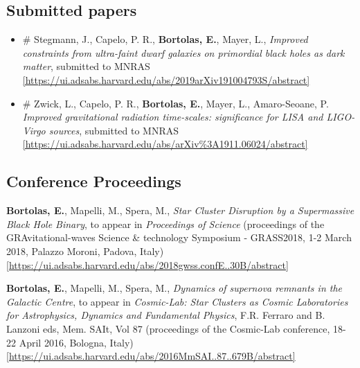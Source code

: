 \documentclass[11pt,a4paper]{article}
\begin{document}
\subsection*{ Submitted papers }

\begin{itemize}
\setlength\itemsep{-1pt}
\item  \# Stegmann, J., Capelo, P. R.,  {\bf Bortolas, E.}, Mayer, L., { \it Improved constraints from ultra-faint dwarf galaxies on primordial black holes as dark matter}, submitted to MNRAS \\ \href{https://ui.adsabs.harvard.edu/abs/2019arXiv191004793S/abstract}{\scriptsize [https://ui.adsabs.harvard.edu/abs/2019arXiv191004793S/abstract]}

\item  \# Zwick, L., Capelo, P. R., \textbf{Bortolas, E.}, Mayer, L., Amaro-Seoane, P. { \it Improved gravitational radiation time-scales: significance for LISA and LIGO-Virgo sources}, submitted to MNRAS \\ \href{https://ui.adsabs.harvard.edu/abs/arXiv\%3A1911.06024/abstract}{\scriptsize [https://ui.adsabs.harvard.edu/abs/arXiv\%3A1911.06024/abstract]}
\end{itemize}


\subsection*{Conference Proceedings }



\begin{etaremune}

\item {\bf Bortolas, E.}, Mapelli, M., Spera, M., {\it Star Cluster Disruption by a Supermassive Black Hole Binary}, to appear in {\it Proceedings of Science}  (proceedings of the  GRAvitational-waves Science \& technology Symposium - GRASS2018, 1-2 March 2018, Palazzo Moroni, Padova, Italy) \\ \href{https://ui.adsabs.harvard.edu/abs/2018gwss.confE..30B/abstract}{\scriptsize [https://ui.adsabs.harvard.edu/abs/2018gwss.confE..30B/abstract]}




\item {\bf Bortolas, E.}, Mapelli, M., Spera, M., {\it Dynamics of supernova remnants in the Galactic Centre}, to appear in {\it Cosmic-Lab: Star Clusters as Cosmic Laboratories for Astrophysics, Dynamics and Fundamental Physics}, F.R. Ferraro and B. Lanzoni eds, Mem. SAIt, Vol 87 (proceedings of the Cosmic-Lab conference, 18-22 April 2016, Bologna, Italy)\\ \href{https://ui.adsabs.harvard.edu/abs/2016MmSAI..87..679B/abstract}{\scriptsize [https://ui.adsabs.harvard.edu/abs/2016MmSAI..87..679B/abstract]}



\end{etaremune}
\end{document}
